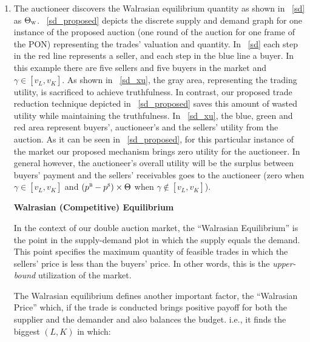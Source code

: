 \begin{enumerate}
\item The auctioneer discovers the Walrasian equilibrium quantity as shown in \figureautorefname~\ref{sd} as $\Theta_\textsc{w}$. \figureautorefname~\ref{sd_proposed} depicts the discrete supply and demand graph for one instance of the proposed auction (one round of the auction for one frame of the \ac{PON}) representing the trades' valuation and quantity. In \figureautorefname~\ref{sd} each step in the red line represents a seller, and each step in the blue line a buyer. In this example there are five sellers and five buyers in the market and $\gamma \in [{v^{}_L} , {v^{}_K}]$. As shown in \figureautorefname~\ref{sd_xu}, the gray area, representing the trading utility, is sacrificed to achieve truthfulness. In contrast, our proposed trade reduction technique depicted in \figureautorefname~\ref{sd_proposed} saves this amount of wasted utility while maintaining the truthfulness. In \figureautorefname~\ref{sd_xu}, the blue, green and red area represent buyers', auctioneer's and the sellers' utility from the auction. As it can be seen in \figureautorefname~\ref{sd_proposed}, for this particular instance of the market our proposed mechanism brings zero utility for the auctioneer. In general however, the auctioneer's overall utility will be the surplus between buyers' payment and the sellers' receivables goes to the auctioneer (zero when $\gamma \in [{v^{}_L} , {v^{}_K}]$ and $(p^\textsc{b} - p^\textsc{s}) \times \Theta$ when $\gamma \notin [{v^{}_L} , {v^{}_K}]$).




\begin{Definition}
\textbf{Walrasian (Competitive) Equilibrium}

In the context of our double auction market, the ``Walrasian Equilibrium'' is the point in the supply-demand plot in which the supply equals the demand. This point specifies the maximum quantity of feasible trades in which the sellers' price is less than the buyers' price. In other words, this is the \textit{upper-bound} utilization of the market.
\end{Definition}

The Walrasian equilibrium defines another important factor, the ``Walrasian Price'' which, if the trade is conducted brings positive payoff for both the supplier and the demander and also balances the budget. i.e., it finds the biggest $(L, K)$ in which:


\end{enumerate}
